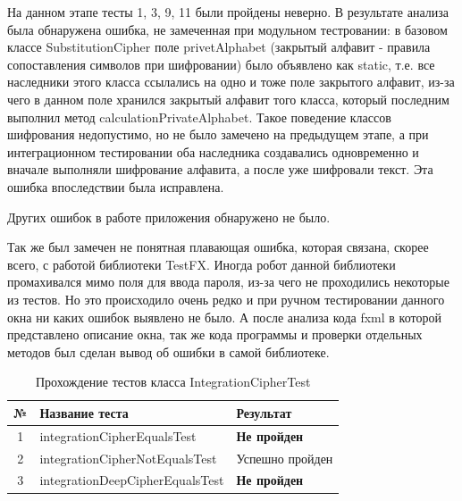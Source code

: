 \documentclass[a4paper,12pt]{article}
\begin{document}
На данном этапе тесты 1, 3, 9, 11 были пройдены неверно.
В результате анализа  была обнаружена ошибка, не замеченная при модульном тестровании: в базовом классе SubstitutionCipher поле privetAlphabet (закрытый алфавит - правила сопоставления символов при шифровании) было объявлено как static, т.е. все наследники этого класса ссылались на одно и тоже поле закрытого алфавит, из-за чего в данном поле хранился закрытый алфавит того класса, который последним выполнил метод calculationPrivateAlphabet. Такое поведение классов шифрования недопустимо, но не было замечено на предыдущем этапе, а при интеграционном тестировании оба наследника создавались одновременно и вначале выполняли шифрование алфавита, а после уже шифровали текст. Эта ошибка впоследствии была исправлена.
\par Других ошибок в работе приложения обнаружено не было.
\par Так же был замечен не понятная плавающая ошибка, которая связана, скорее всего, с работой библиотеки TestFX. Иногда робот данной библиотеки промахивался мимо поля для ввода пароля, из-за чего не проходились некоторые из тестов. Но это происходило очень редко и при ручном тестировании данного окна ни каких ошибок выявлено не было. А после анализа кода fxml в которой представлено описание окна, так же кода программы и проверки отдельных методов был сделан вывод об ошибки в самой библиотеке.

\begin{table}[h]
	\caption{Прохождение тестов класса IntegrationCipherTest}
	\centering
	\begin{tabular}{|c|l|l|}
	\hline 
	№ &  Название теста & Результат \\ 
	\hline 
	1 &  integrationCipherEqualsTest & \textbf{Не пройден}  \\
	\hline 
	2 &  integrationCipherNotEqualsTest & Успешно пройден  \\
	\hline 
	3 & integrationDeepCipherEqualsTest & \textbf{Не пройден}  \\
	\hline 
\end{tabular} 
\label{table:modul_testing_IntegrationCipherTest} 
\end{table}
\end{document}
